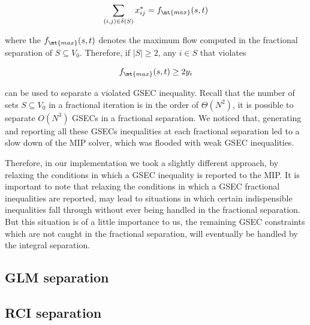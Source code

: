 \begin{equation}
	\sum_{(i, j) \in \delta(S)} x^*_{ij} = f_{\mt{max}}(s, t)
\end{equation}

where the $f_{\mt{max}}(s, t)$ denotes the maximum flow computed in the fractional separation of $S \subseteq V_0$.
Therefore, if $|S| \ge 2$, any $i \in S$ that violates

\begin{equation}
	f_{\mt{max}}(s, t) \ge 2 y_i
\end{equation}

can be used to separate a violated GSEC inequality.
Recall that the number of sets $S \subseteq V_0$ in a fractional iteration is in the order of $\Theta(N^2)$, it is possible to separate $O(N^3)$ GSECs in a fractional separation.
We noticed that, generating and reporting all these GSECs inequalities at each fractional separation led to a slow down of the MIP solver, which was flooded with weak GSEC inequalities.

Therefore, in our implementation we took a slightly different approach, by relaxing the conditions in which a GSEC inequality is reported to the MIP.
It is important to note that relaxing the conditions in which a GSEC fractional inequalities are reported, may lead to situations in which certain indispensible inequalities fall through without ever being handled in the fractional separation.
But this situation is of a little importance to us, the remaining GSEC constraints which are not caught in the fractional separation, will eventually be handled by the integral separation.



\subsection{GLM separation}

\subsection{RCI separation}
